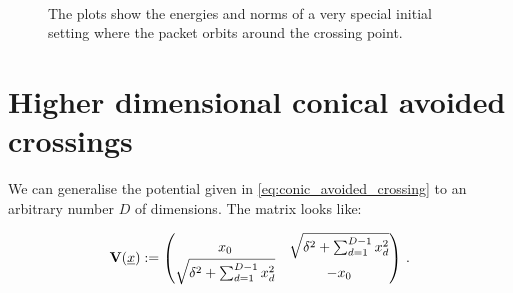 \begin{figure}
  \centering
   \\
  \caption[Energies and norms for a special setting]{
    The plots show the energies and norms of a very special initial setting
    where the packet orbits around the crossing point.
    \label{fig:conic_circle}
  }
\end{figure}


\FloatBarrier
\section{Higher dimensional conical avoided crossings}

We can generalise the potential given in \eqref{eq:conic_avoided_crossing}
to an arbitrary number $D$ of dimensions. The matrix looks like:

\begin{equation} \label{eq:conic_avoided_crossing_DD}
  \mathbf{V}(\underline{x}) :=
  \begin{pmatrix}
    x_0                                      & \sqrt{\delta^2 + \sum_{d=1}^{D-1} x_d^2} \\
    \sqrt{\delta^2 + \sum_{d=1}^{D-1} x_d^2} & -x_0
  \end{pmatrix} \,.
\end{equation}

